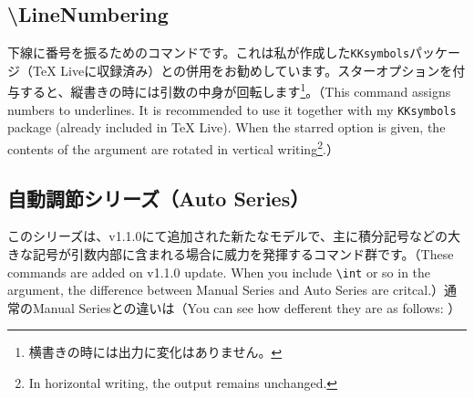 \documentclass[luatex,fontsize=8pt,paper=b5,twoside]{jlreq}%
\begin{document}

\subsection{\textbackslash LineNumbering}
下線に番号を振るためのコマンドです。これは私が作成した\texttt{KKsymbols}パッケージ（TeX Liveに収録済み）との併用をお勧めしています。スターオプションを付与すると、縦書きの時には引数の中身が回転します\footnote{横書きの時には出力に変化はありません。}。（This command assigns numbers to underlines.
It is recommended to use it together with my \texttt{KKsymbols} package (already included in TeX Live).
When the starred option is given, the contents of the argument are rotated in vertical writing\footnote{In horizontal writing, the output remains unchanged.}.）



\subsection{自動調節シリーズ（Auto Series）}
このシリーズは、v1.1.0にて追加された新たなモデルで、主に積分記号などの大きな記号が引数内部に含まれる場合に威力を発揮するコマンド群です。（These commands are added on v1.1.0 update. When you include \verb|\int| or so in the argument, the difference between Manual Series and Auto Series are critcal.）通常のManual Seriesとの違いは（You can see how defferent they are as follows: ）
\end{document}
